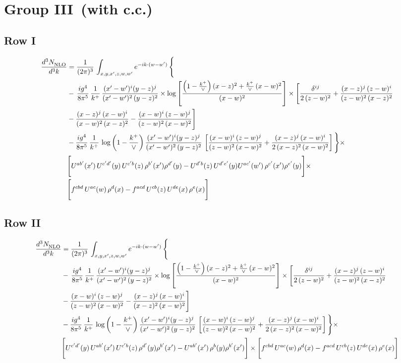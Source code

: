 \documentclass[9pt]{article}
\numberwithin{equation}{section}
\begin{document}
\section{Group III\, (with c.c.)}
\subsection{Row I}
\begin{align}
     \frac{d^{3}N_{\rm NLO}^{\rm}}{d^{3}k}  & =   \frac{1}{(2\pi)^{3}}\, \int_{x,y,x',z,w,w^{\prime}} e^{-ik\cdot (w-w')}\, \Bigg\{\notag \\
& -\,\frac{ig^{4}}{8\pi^{5}}\,\frac{1}{k^{+}}\,\frac{(x'-w')^{i}(y-z)^{j}}{(x'-w')^{2}\,(y-z)^{2}}\times \log{\left[\frac{\left(1-\frac{k^{+}}{\vee}\right)(x-z)^{2}+\frac{k^{+}}{\vee}\,(x-w)^{2}}{(x-w)^{2}}\right]}\times \Bigg[\frac{\delta^{ij}}{2\,(z-w)^{2}}+\frac{(x-z)^{j}\,(z-w)^{i}}{(z-w)^{2}\,(x-z)^{2}}\notag \\ & -\frac{(x-z)^{j}\,(x-w)^{i}}{(x-w)^{2}\,(x-z)^{2}}-\frac{(x-w)^{i}\,(z-w)^{j}}{(z-w)^{2}\,(x-w)^{2}}\Bigg] \notag \\
& -\frac{ig^{4}}{8\pi^{5}}\,\frac{1}{k^{+}}\,\log{\left(1-\frac{k^{+}}{\vee}\right)}\,\frac{(x'-w')^{i}(y-z)^{j}}{(x'-w')^{2}\,(y-z)^{2}}\,\left[\frac{(x-w)^{i}\,(z-w)^{j}}{(z-w)^{2}\,(x-w)^{2}}+\frac{(x-z)^{j}\,(x-w)^{i}}{2\,(x-z)^{2}\, (x-w)^{2}}\right]\Bigg\}\times \notag \\ &  \Bigg[U^{ab'}(x')\,U^{c'd'}(y)\,U^{c'b}(z)\,\rho^{b'}(x')\rho^{d'}(y)-U^{d'b}(z)\,U^{d'e'}(y)U^{ac'}(w')\,\rho^{c'}(x')\rho^{e'}(y)\Bigg]\times\notag \\ & \Bigg[f^{cbd}\,U^{ac}(w)\,\rho^{d}(x)-f^{acd}\, U^{cb}(z)\,U^{de}(x)\,\rho^{e}(x)\Bigg]
\end{align}
\subsection{Row II}
\begin{align}
     \frac{d^{3}N_{\rm NLO}^{\rm}}{d^{3}k}  & =   \frac{1}{(2\pi)^{3}}\, \int_{x,y,x',z,w,w^{\prime}} e^{-ik\cdot (w-w')}\, \Bigg\{\notag \\
& -\,\frac{ig^{4}}{8\pi^{5}}\,\frac{1}{k^{+}}\,\frac{(x'-w')^{i}(y-z)^{j}}{(x'-w')^{2}\,(y-z)^{2}}\times \log{\left[\frac{\left(1-\frac{k^{+}}{\vee}\right)(x-z)^{2}+\frac{k^{+}}{\vee}\,(x-w)^{2}}{(x-w)^{2}}\right]}\times \Bigg[\frac{\delta^{ij}}{2\,(z-w)^{2}}+\frac{(x-z)^{j}\,(z-w)^{i}}{(z-w)^{2}\,(x-z)^{2}}\notag \\ & -\frac{(x-w)^{i}\,(z-w)^{j}}{(z-w)^{2}\,(x-w)^{2}}-\frac{(x-z)^{j}\,(x-w)^{i}}{(x-z)^{2}\,(x-w)^{2}}\Bigg] \notag \\
& -\frac{ig^{4}}{8\pi^{5}}\,\frac{1}{k^{+}}\,\log{\left(1-\frac{k^{+}}{\vee}\right)}\,\frac{(x'-w')^{i}(y-z)^{j}}{(x'-w')^{2}\,(y-z)^{2}}\,\left[\frac{(x-w)^{i}\,(z-w)^{j}}{(z-w)^{2}\,(x-w)^{2}}+\frac{(x-z)^{j}\,(x-w)^{i}}{2\,(x-z)^{2}\, (x-w)^{2}}\right]\Bigg\}\times \notag \\ & \Bigg[U^{c'd'}(y)\,U^{ab'}(x')\,U^{c'b}(z)\,\rho^{d'}(y)\rho^{b'}(x')-U^{ab'}(x')\,\rho^{b}(y)\rho^{b'}(x')\Bigg]\times\Bigg[f^{cbd}\,U^{ac}(w)\,\rho^{d}(x)-f^{acd}\, U^{cb}(z)\,U^{de}(x)\,\rho^{e}(x)\Bigg]
\end{align}
\end{document}
